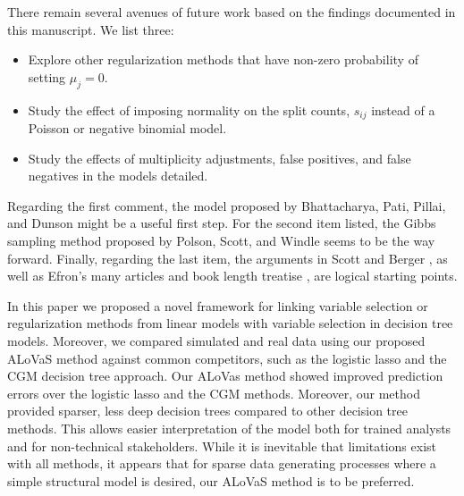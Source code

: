 There remain several avenues of future work based on the findings documented in this manuscript. We list three:

\begin{itemize}
\item Explore other regularization methods that have non-zero probability of setting $\mu_j=0$. 
\item Study the effect of imposing normality on the split counts, $s_{ij}$ instead of a Poisson or negative binomial model. 
\item Study the effects of multiplicity adjustments, false positives, and false negatives in the models detailed. 
\end{itemize}

Regarding the first comment, the model proposed by Bhattacharya, Pati, Pillai, and Dunson \cite{bhattacharya2012bayesian} might be a useful first step. For the second item listed, the Gibbs sampling method proposed by Polson, Scott, and Windle \cite{polson2013bayesian} seems to be the way forward. Finally, regarding the last item, the arguments in Scott and Berger \cite{scott2010bayes}, as well as Efron's many articles and book length treatise \cite{efron2009empirical,efron2004large,efron2007correlation,efron2010large}, are logical starting points. 

In this paper we proposed a novel framework for linking variable selection or regularization methods from linear models with variable selection in decision tree models. Moreover, we compared simulated and real data using our proposed ALoVaS method against common competitors, such as the logistic lasso and the CGM decision tree approach. Our ALoVas method showed improved prediction errors over the logistic lasso and the CGM methods. Moreover, our method provided sparser, less deep decision trees compared to other decision tree methods. This allows easier interpretation of the model both for trained analysts and for non-technical stakeholders. While it is inevitable that limitations exist with all methods, it appears that for sparse data generating processes where a simple structural model is desired, our ALoVaS method is to be preferred.  
